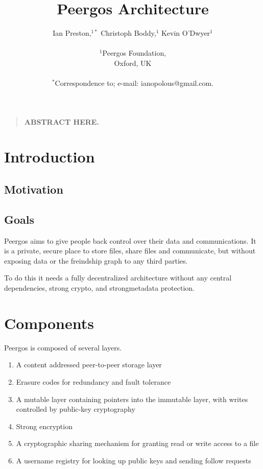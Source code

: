 \documentclass[12pt]{article}
\title{Peergos Architecture}
\author
{Ian Preston,$^{1\ast}$ Christoph Boddy,$^{1}$ Kevin O'Dwyer$^{1}$\\
\\
\normalsize{$^{1}$Peergos Foundation,}\\
\normalsize{Oxford, UK}\\
\\
\normalsize{$^\ast$Correspondence to; e-mail:  ianopolous@gmail.com.}
}
\date{}
\newenvironment{sciabstract}{%
\begin{quote} \bf}
{\end{quote}}
\begin{document}
 


\baselineskip24pt


\maketitle 




\begin{sciabstract}
        ABSTRACT  HERE.
\end{sciabstract}


\section*{Introduction}

\subsection*{Motivation}


\subsection*{Goals}
Peergos aims to give people back control over their data and communications. It is a private, secure place to store files, share files and communicate, but without exposing data or the freindship graph to any third parties. 

To do this it needs a fully decentralized architecture without any central dependencies, strong crypto, and strongmetadata protection. 

\section*{Components}
Peergos is composed of several layers.

\begin{enumerate}
\item A content addressed peer-to-peer storage layer
\item Erasure codes for redundancy and fault tolerance
\item A mutable layer containing pointers into the immutable layer, with writes controlled by public-key cryptography
\item Strong encryption
\item A cryptographic sharing mechanism for granting read or write access to a file
\item A username registry for looking up public keys and sending follow requests
\end{enumerate}
\end{document}
